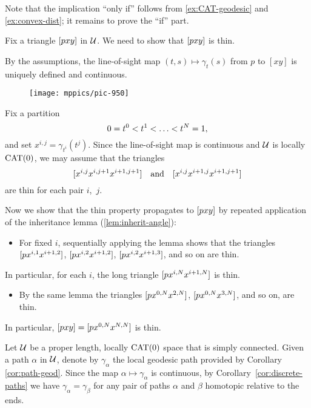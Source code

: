 Note that the implication ``only if'' follows from \ref{ex:CAT-geodesic} and \ref{ex:convex-dist}; it remains to prove the ``if'' part.

Fix a triangle $[pxy]$  in $\mathcal{U}$. 
We need to show that $[pxy]$ is thin.

By the assumptions, the line-of-sight map  $(t,s)\mapsto\gamma_t(s)$ from $p$ to   $[x y]$ is uniquely defined and continuous.    


\begin{figure}[h!]
\vskip0mm
\centering
\texttt{[image: mppics/pic-950]}
\end{figure}

Fix  a partition \[0\z=t^0\z<t^1\z<\z\dots\z<t^N=1,\] 
and set $x^{i,j}=\gamma_{t^i}(t^j)$. 
Since the line-of-sight map is continuous and $\mathcal{U}$ is locally $\mathrm{CAT}(0)$, we may assume that the triangles 
\[[x^{i,j}x^{i,j+1}x^{i+1,j+1}]\quad\text{and}\quad[x^{i,j}x^{i+1,j}x^{i+1,j+1}]\] 
are thin for each pair $i$,~$j$.

Now we show that the thin property propagates to $[pxy]$ by repeated application of the inheritance lemma (\ref{lem:inherit-angle}):
\begin{itemize}
\item 
For fixed $i$, 
sequentially applying the lemma shows that the triangles 
$[px^{i,1}x^{i+1,2}]$, 
$[px^{i,2}x^{i+1,2}]$, 
$[px^{i,2}x^{i+1,3}]$,
and so on are thin. 
\end{itemize}
In particular, for each $i$, the long triangle $[px^{i,N}x^{i+1,N}]$ is thin.
\begin{itemize} 
\item 
By the same lemma the  triangles $[px^{0,N}x^{2,N}]$, $[px^{0,N}x^{3,N}]$, and so on, are thin. 
\end{itemize}
In particular, $[pxy]=[px^{0,N}x^{N,N}]$ is thin.
\qeds

Let $\mathcal{U}$ be a proper length, locally $\mathrm{CAT}(0)$ space that is simply connected.
Given a path $\alpha$ in $\mathcal{U}$, 
denote by $\gamma_\alpha$ the local geodesic path provided by Corollary \ref{cor:path-geod}.
Since the map $\alpha\mapsto\gamma_\alpha$ is continuous, by Corollary~\ref{cor:discrete-paths}
we have $\gamma_\alpha=\gamma_\beta$ for any pair of  paths $\alpha$ and $\beta$  homotopic relative to the ends.

